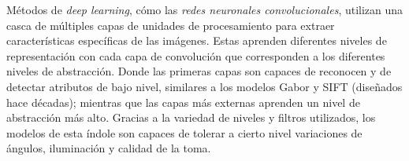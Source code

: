 \documentclass[letterpaper, 10 pt, conference]{ieeeconf}  %
\begin{document}
    Métodos de \textit{deep learning}, cómo las \textit{redes neuronales convolucionales},
    utilizan una casca de múltiples capas de unidades de procesamiento para extraer
    características específicas de las imágenes. Estas aprenden diferentes niveles de
    representación con cada capa de convolución que corresponden a los diferentes niveles
    de abstracción. Donde las primeras capas son capaces de reconocen y de detectar
    atributos de bajo nivel, similares a los modelos Gabor y SIFT (diseñados hace décadas);
    mientras que las capas más externas aprenden un nivel de abstracción más alto.
    Gracias a la variedad de niveles y filtros utilizados, los modelos de
    esta índole son capaces de tolerar a cierto nivel variaciones de ángulos,
    iluminación y calidad de la toma. \cite{Wang2021}
\end{document}
